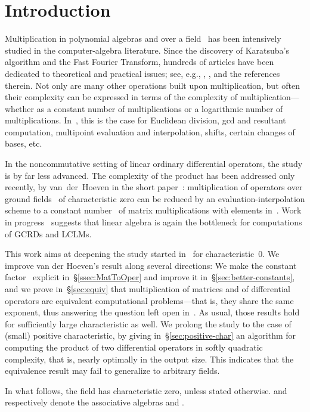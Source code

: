 \documentclass{sig-alt-full}
\begin{document}
\section{Introduction}

Multiplication in polynomial algebras  and  over a field~ has been intensively studied in the computer-algebra literature.
Since the discovery of Karatsuba's algorithm and the Fast Fourier Transform, hundreds of articles have been dedicated to theoretical and practical issues;
see, e.g., \cite[Ch.~8]{GaGe99}, \cite{Bernstein}, and the references therein.
Not only are many other operations built upon multiplication, but often their complexity can be expressed in terms of the complexity of multiplication---whether as a constant number of multiplications or a logarithmic number of multiplications.
In~, this is the case for Euclidean division, gcd and resultant computation, multipoint evaluation and interpolation, shifts, certain changes of bases, etc.

In the noncommutative setting of linear ordinary differential operators, the study is by far less advanced.
The complexity of the product has been addressed only recently, by van~der~Hoeven in the short paper~\cite{vdHoeven02}:
multiplication of operators over ground fields~ of characteristic zero can be reduced by an evaluation-interpolation scheme to a constant number~ of matrix multiplications with elements in~.
Work in progress~\cite{LCLMs} suggests that linear algebra is again the bottleneck for computations of GCRDs and LCLMs.

This work aims at deepening the study started in~\cite{vdHoeven02} for characteristic~0.
We improve van der Hoeven's result along several directions:
We make the constant factor~ explicit in~\S\ref{ssec:MatToOper} and improve it in~\S\ref{sec:better-constants}, and we prove in~\S\ref{sec:equiv} that multiplication of matrices and of differential operators are equivalent computational problems---that is, they share the same exponent, 
thus answering the question left open in~\cite[\S6, Remark~2]{vdHoeven02}.
As usual, those results hold for sufficiently large characteristic as well.
We prolong the study to the case of (small) positive characteristic, by giving in~\S\ref{sec:positive-char} an algorithm for computing the product of two differential operators in softly quadratic complexity, that is, nearly optimally in the output size.
This indicates that the equivalence result may fail to generalize to arbitrary fields.


In what follows, the field  has characteristic zero, unless stated otherwise.
 and  respectively denote the associative algebras  and .
\end{document}

